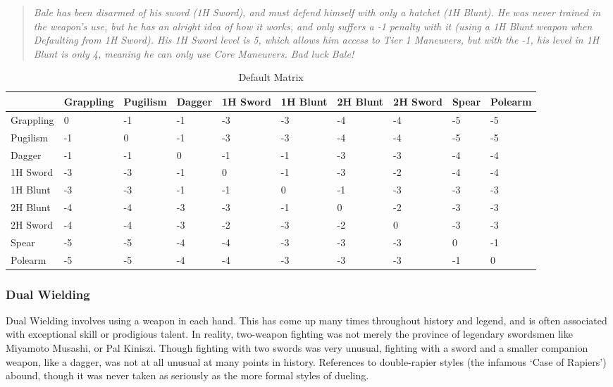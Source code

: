 \documentclass[oneside,11pt,english]{book}
\begin{document}
\begin{quote}
  \emph{Bale has been disarmed of his sword (1H Sword), and must defend himself
    with only a hatchet (1H Blunt). He was never trained in the weapon’s use,
    but he has an alright idea of how it works, and only suffers a -1 penalty
    with it (using a 1H Blunt weapon when Defaulting from 1H Sword). His 1H
    Sword level is 5, which allows him access to Tier 1 Maneuvers, but with the
    -1, his level in 1H Blunt is only 4, meaning he can only use Core Maneuvers.
    Bad luck Bale! } 
\end{quote}

\begin{table}
  \centering
  \caption{Default Matrix}
  \label{tab:Default Matrix}
  \begin{tabu} spread 0pt {*{10}{X[-1,c]}}
              & Grappling & Pugilism & Dagger & 1H Sword & 1H Blunt & 2H Blunt & 2H Sword & Spear & Polearm \\\toprule
    Grappling & 0         & -1       & -1     & -3       & -3       & -4       & -4       & -5    & -5      \\
    Pugilism  & -1        & 0        & -1     & -3       & -3       & -4       & -4       & -5    & -5      \\
    Dagger    & -1        & -1       & 0      & -1       & -1       & -3       & -3       & -4    & -4      \\
    1H Sword  & -3        & -3       & -1     & 0        & -1       & -3       & -2       & -4    & -4      \\
    1H Blunt  & -3        & -3       & -1     & -1       & 0        & -1       & -3       & -3    & -3      \\
    2H Blunt  & -4        & -4       & -3     & -3       & -1       & 0        & -2       & -3    & -3      \\
    2H Sword  & -4        & -4       & -3     & -2       & -3       & -2       & 0        & -3    & -3      \\
    Spear     & -5        & -5       & -4     & -4       & -3       & -3       & -3       & 0     & -1      \\
    Polearm   & -5        & -5       & -4     & -4       & -3       & -3       & -3       & -1    & 0       \\
  \end{tabu}
\end{table}

\subsubsection{Dual Wielding}
Dual Wielding involves using a weapon in each hand. This has come up many times
throughout history and legend, and is often associated with exceptional skill or
prodigious talent. In reality, two-weapon fighting was not merely the province
of legendary swordsmen like Miyamoto Musashi, or Pal Kiniszi. Though fighting
with two swords was very unusual, fighting with a sword and a smaller companion
weapon, like a dagger, was not at all unusual at many points in history.
References to double-rapier styles (the infamous ‘Case of Rapiers’) abound,
though it was never taken as seriously as the more formal styles of dueling. 
\end{document}
